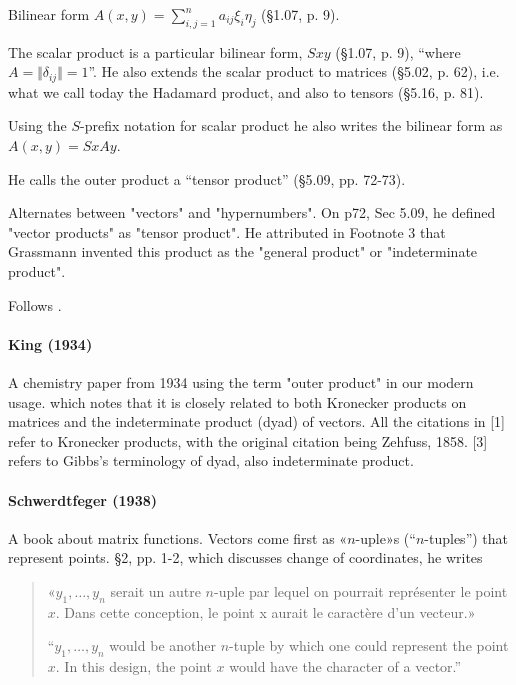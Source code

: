 Bilinear form $A(x, y) = \sum^n_{i,j=1} a_{ij} \xi_i \eta_j $ (\S 1.07, p. 9).

The scalar product is a particular bilinear form, $S x y$ (\S 1.07, p. 9), ``where $A = \Vert \delta_{ij} \Vert = 1$''. He also extends the scalar product to matrices (\S 5.02, p. 62), i.e. what we call today the Hadamard product, and also to tensors (\S 5.16, p. 81).

Using the $S$-prefix notation for scalar product he also writes the bilinear form as $A(x, y) = SxAy$.

He calls the outer product a ``tensor product'' (\S 5.09, pp. 72-73).

Alternates between "vectors"
and "hypernumbers". On p72, Sec 5.09, he defined "vector products" as
"tensor product". He attributed in Footnote 3 that Grassmann invented
this product as the "general product" or "indeterminate product".

Follows \cite{Scheffers1889}.



\paragraph{King (1934)}

A chemistry paper from 1934 using the term "outer product" in
our modern usage. which notes that it is closely related to both Kronecker products on
matrices and the indeterminate product (dyad) of vectors. All the
citations in [1] refer to Kronecker products, with the original
citation being Zehfuss, 1858. [3] refers to Gibbs's terminology of
dyad, also indeterminate product.

\paragraph{Schwerdtfeger (1938)~\cite{Schwerdtfeger1938}}

A book about matrix functions.
Vectors come first as «$n$-uple»s (``$n$-tuples'') that represent points. \S 2, pp. 1-2, which discusses change of coordinates, he writes
\begin{quote}
«$y_1, \dots, y_n$ serait un autre $n$-uple par lequel on pourrait représenter le point $x$. Dans cette conception, le point x aurait le caractère d'un vecteur.»

``$y_1, \dots, y_n$ would be another $n$-tuple by which one could represent the point $x$. In this design, the point $x$ would have the character of a vector.''
\end{quote}


